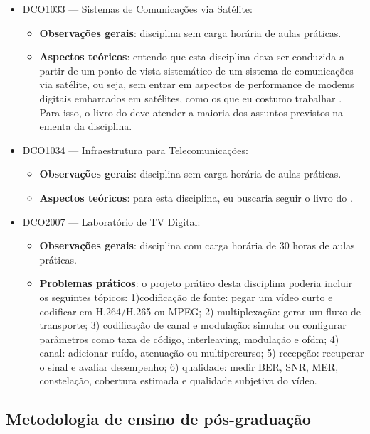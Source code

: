 \documentclass{article}
\begin{document}
\begin{itemize}
\begin{itemize}
    \end{itemize}
    \item DCO1033 --- Sistemas de Comunicações via Satélite:
    \begin{itemize}
        \item \textbf{Observações gerais}: disciplina sem carga horária de aulas práticas.
        \item \textbf{Aspectos teóricos}: entendo que esta disciplina deva ser conduzida a partir de um ponto de vista sistemático de um sistema de comunicações via satélite, ou seja, sem entrar em aspectos de performance de modems digitais embarcados em satélites, como os que eu costumo trabalhar \cite{pacelliAlldigitalCoherentAFSK2025}. Para isso, o livro do \textcite{roddySatelliteCommunications2006} deve atender a maioria dos assuntos previstos na ementa da disciplina.
    \end{itemize}
    \item DCO1034 --- Infraestrutura para Telecomunicações:
    \begin{itemize}
        \item \textbf{Observações gerais}: disciplina sem carga horária de aulas práticas.
        \item \textbf{Aspectos teóricos}: para esta disciplina, eu buscaria seguir o livro do \textcite{ferrariTelecomunicacoesEvolucaoRevolucao2003}.
    \end{itemize}
    \item DCO2007 --- Laboratório de TV Digital:
    \begin{itemize}
        \item \textbf{Observações gerais}: disciplina com carga horária de 30 horas de aulas práticas.
        \item \textbf{Problemas práticos}: o projeto prático desta disciplina poderia incluir os seguintes tópicos: 1)codificação de fonte: pegar um vídeo curto e codificar em H.264/H.265 ou MPEG; 2) multiplexação: gerar um fluxo de transporte; 3) codificação de canal e modulação: simular ou configurar parâmetros como taxa de código, interleaving, modulação e \gls{ofdm}; 4) canal: adicionar ruído, atenuação ou multipercurso; 5) recepção: recuperar o sinal e avaliar desempenho; 6) qualidade: medir BER, SNR, MER, constelação, cobertura estimada e qualidade subjetiva do vídeo.
    \end{itemize}
\end{itemize}

\subsection{Metodologia de ensino de pós-graduação}
\end{document}
